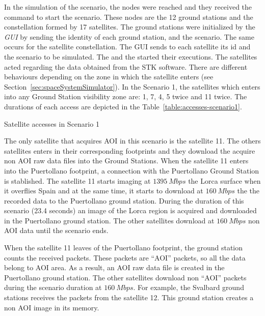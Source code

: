 In the simulation of the scenario, the \vw nodes were reached and they received
the command to start the scenario. These nodes are the 12 ground stations and
the constellation formed by 17 satellites. The ground stations were initialized by
the \emph{GUI} by sending the identity of each ground station, and
the scenario. 
The same occurs for the satellite constellation. The \ac{GUI} sends to each
satellite its id and the scenario to be simulated.
 The \satss and the \gsss started their executions. The satellites acted regarding the data obtained from the \ac{STK} software. 
There are different behaviours depending on the zone in which the satellite enters (see
Section~\ref{sec:spaceSystemSimulator}). In the Scenario 1, the satellites which
enters into any Ground Station visibility zone are: 1, 7, 4, 5 twice and 11
twice. The
durations of each access are depicted in the Table~\ref{table:accesses-scenario1}.
\begin{table}[!h]
  \centering
  {\small
  
  }
  \caption{Satellite accesses in Scenario 1}
  \label{table:accesses-scenario1}
\end{table}

The only satellite that acquires \ac{AOI} in this scenario is the satellite
11. The others satellites enters in their corresponding footprints and they
download the acquire non \ac{AOI} raw data files into the Ground Stations. When the satellite 11 enters into the Puertollano footprint, a connection with
the Puertollano Ground Station is stablished. The satellite
11 starts imaging at $1395~Mbps$ the Lorca surface when it overflies Spain and at the same time, it
starts to download at $160~Mbps$ the the recorded data to the Puertollano ground station. During the
duration of this scenario (23.4 seconds) an image of the Lorca region is
acquired and downloaded in the Puertollano ground station. The other satellites
download at $160~Mbps$ non \ac{AOI} data until the scenario ends. 

When the satellite 11 leaves of the Puertollano footprint, the ground station
counts the received packets. These packets are ``AOI'' packets, so all the data
belong to \ac{AOI} area. As a result, an \ac{AOI} raw data file is created in the
Puertollano ground station. 
The other satellites download non ``AOI'' packets during the scenario duration
at $160~Mbps$. For example, the Svalbard ground stations receives the packets
from the satellite 12. This ground station creates a non \ac{AOI} image in its
memory.


